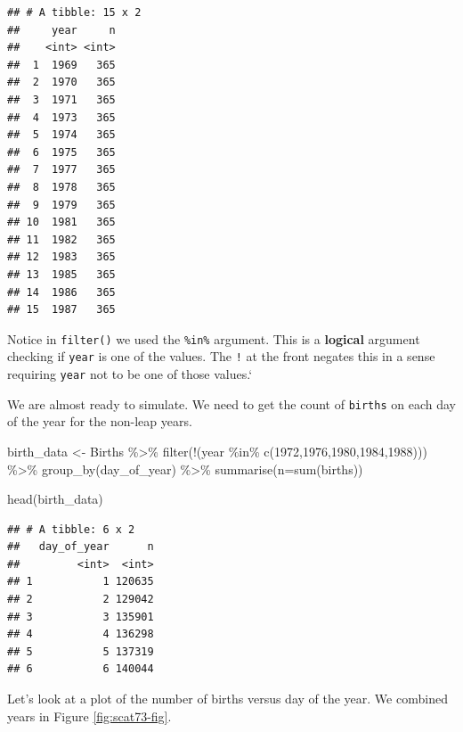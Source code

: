 \documentclass[
]{book}
\newenvironment{Shaded}{\begin{snugshade}}{\end{snugshade}}
\newcommand{\AttributeTok}[1]{\textcolor[rgb]{0.77,0.63,0.00}{#1}}
\newcommand{\DecValTok}[1]{\textcolor[rgb]{0.00,0.00,0.81}{#1}}
\newcommand{\FunctionTok}[1]{\textcolor[rgb]{0.00,0.00,0.00}{#1}}
\newcommand{\NormalTok}[1]{#1}
\newcommand{\OtherTok}[1]{\textcolor[rgb]{0.56,0.35,0.01}{#1}}
\newcommand{\SpecialCharTok}[1]{\textcolor[rgb]{0.00,0.00,0.00}{#1}}
\begin{document}
\begin{verbatim}
## # A tibble: 15 x 2
##     year     n
##    <int> <int>
##  1  1969   365
##  2  1970   365
##  3  1971   365
##  4  1973   365
##  5  1974   365
##  6  1975   365
##  7  1977   365
##  8  1978   365
##  9  1979   365
## 10  1981   365
## 11  1982   365
## 12  1983   365
## 13  1985   365
## 14  1986   365
## 15  1987   365
\end{verbatim}

Notice in \texttt{filter()} we used the \texttt{\%in\%} argument. This is a \textbf{logical} argument checking if \texttt{year} is one of the values. The \texttt{!} at the front negates this in a sense requiring \texttt{year} not to be one of those values.`

We are almost ready to simulate. We need to get the count of \texttt{births} on each day of the year for the non-leap years.

\begin{Shaded}
\begin{Highlighting}[]
\NormalTok{birth\_data }\OtherTok{\textless{}{-}}\NormalTok{ Births }\SpecialCharTok{\%\textgreater{}\%}
  \FunctionTok{filter}\NormalTok{(}\SpecialCharTok{!}\NormalTok{(year }\SpecialCharTok{\%in\%} \FunctionTok{c}\NormalTok{(}\DecValTok{1972}\NormalTok{,}\DecValTok{1976}\NormalTok{,}\DecValTok{1980}\NormalTok{,}\DecValTok{1984}\NormalTok{,}\DecValTok{1988}\NormalTok{))) }\SpecialCharTok{\%\textgreater{}\%}
  \FunctionTok{group\_by}\NormalTok{(day\_of\_year) }\SpecialCharTok{\%\textgreater{}\%}
  \FunctionTok{summarise}\NormalTok{(}\AttributeTok{n=}\FunctionTok{sum}\NormalTok{(births)) }
\end{Highlighting}
\end{Shaded}

\begin{Shaded}
\begin{Highlighting}[]
\FunctionTok{head}\NormalTok{(birth\_data)}
\end{Highlighting}
\end{Shaded}

\begin{verbatim}
## # A tibble: 6 x 2
##   day_of_year      n
##         <int>  <int>
## 1           1 120635
## 2           2 129042
## 3           3 135901
## 4           4 136298
## 5           5 137319
## 6           6 140044
\end{verbatim}

Let's look at a plot of the number of births versus day of the year. We combined years in Figure \ref{fig:scat73-fig}.
\end{document}
